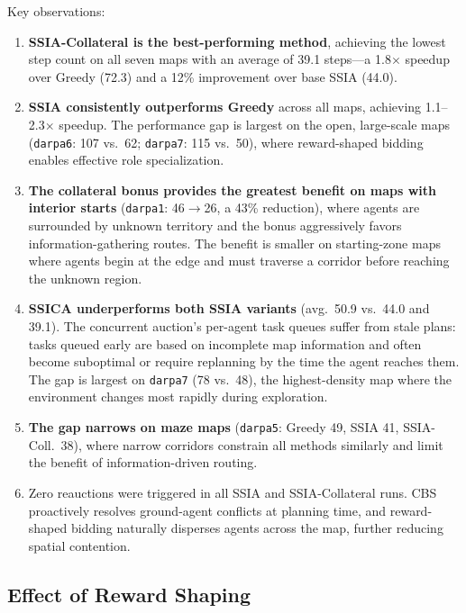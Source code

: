 \documentclass[conference]{IEEEtran}
\begin{document}
Key observations:
\begin{enumerate}
    \item \textbf{SSIA-Collateral is the best-performing method}, achieving the lowest step count on all seven maps with an average of 39.1 steps---a 1.8$\times$ speedup over Greedy (72.3) and a 12\% improvement over base SSIA (44.0).
    \item \textbf{SSIA consistently outperforms Greedy} across all maps, achieving 1.1--2.3$\times$ speedup. The performance gap is largest on the open, large-scale maps (\texttt{darpa6}: 107 vs.\ 62; \texttt{darpa7}: 115 vs.\ 50), where reward-shaped bidding enables effective role specialization.
    \item \textbf{The collateral bonus provides the greatest benefit on maps with interior starts} (\texttt{darpa1}: 46$\to$26, a 43\% reduction), where agents are surrounded by unknown territory and the bonus aggressively favors information-gathering routes. The benefit is smaller on starting-zone maps where agents begin at the edge and must traverse a corridor before reaching the unknown region.
    \item \textbf{SSICA underperforms both SSIA variants} (avg.\ 50.9 vs.\ 44.0 and 39.1). The concurrent auction's per-agent task queues suffer from stale plans: tasks queued early are based on incomplete map information and often become suboptimal or require replanning by the time the agent reaches them. The gap is largest on \texttt{darpa7} (78 vs.\ 48), the highest-density map where the environment changes most rapidly during exploration.
    \item \textbf{The gap narrows on maze maps} (\texttt{darpa5}: Greedy 49, SSIA 41, SSIA-Coll.\ 38), where narrow corridors constrain all methods similarly and limit the benefit of information-driven routing.
    \item Zero reauctions were triggered in all SSIA and SSIA-Collateral runs. CBS proactively resolves ground-agent conflicts at planning time, and reward-shaped bidding naturally disperses agents across the map, further reducing spatial contention.
\end{enumerate}

\subsection{Effect of Reward Shaping}
\end{document}
